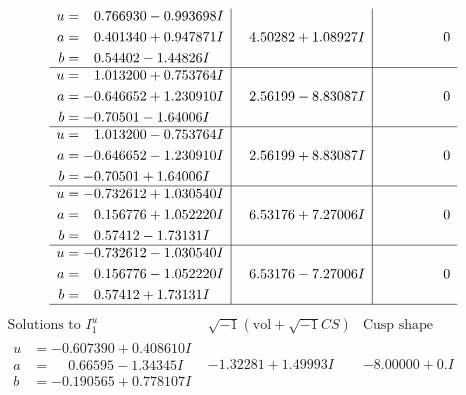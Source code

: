 \documentclass[1p]{elsarticle_modified}
\theoremstyle{definition}
\newcommand{\I}{\sqrt{-1}}
\begin{document}
$$\begin{array}{c|c|c}
\begin{aligned}
u &= \phantom{-}0.766930 - 0.993698 I \\
a &= \phantom{-}0.401340 + 0.947871 I \\
b &= \phantom{-}0.54402 - 1.44826 I\end{aligned}
 & \phantom{-}4.50282 + 1.08927 I & \phantom{-0.000000 } 0 \\ \hline\begin{aligned}
u &= \phantom{-}1.013200 + 0.753764 I \\
a &= -0.646652 + 1.230910 I \\
b &= -0.70501 - 1.64006 I\end{aligned}
 & \phantom{-}2.56199 - 8.83087 I & \phantom{-0.000000 } 0 \\ \hline\begin{aligned}
u &= \phantom{-}1.013200 - 0.753764 I \\
a &= -0.646652 - 1.230910 I \\
b &= -0.70501 + 1.64006 I\end{aligned}
 & \phantom{-}2.56199 + 8.83087 I & \phantom{-0.000000 } 0 \\ \hline\begin{aligned}
u &= -0.732612 + 1.030540 I \\
a &= \phantom{-}0.156776 + 1.052220 I \\
b &= \phantom{-}0.57412 - 1.73131 I\end{aligned}
 & \phantom{-}6.53176 + 7.27006 I & \phantom{-0.000000 } 0 \\ \hline\begin{aligned}
u &= -0.732612 - 1.030540 I \\
a &= \phantom{-}0.156776 - 1.052220 I \\
b &= \phantom{-}0.57412 + 1.73131 I\end{aligned}
 & \phantom{-}6.53176 - 7.27006 I & \phantom{-0.000000 } 0\\
 \hline 
 \end{array}$$\newpage$$\begin{array}{c|c|c}  
\text{Solutions to }I^u_{1}& \I (\text{vol} + \sqrt{-1}CS) & \text{Cusp shape}\\
 \hline 
\begin{aligned}
u &= -0.607390 + 0.408610 I \\
a &= \phantom{-}0.66595 - 1.34345 I \\
b &= -0.190565 + 0.778107 I\end{aligned}
 & -1.32281 + 1.49993 I & -8.00000 + 0. I\phantom{ +0.000000I} \\ \hline\begin{aligned}

\end{aligned}
\end{array}$$
\end{document}
